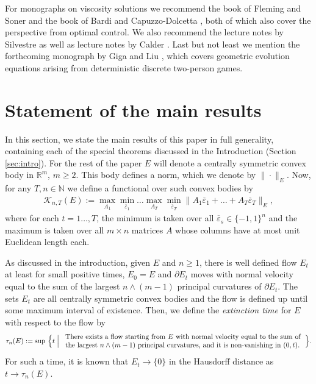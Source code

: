 \documentclass[reqno]{amsart}
\numberwithin{equation}{section}
\newcommand{\R}{\mathbb R}
\begin{document}
For monographs on viscosity solutions we recommend the book of Fleming and Soner \cite{fleming2006controlled} and the book of Bardi and Capuzzo-Dolcetta \cite{bardi1997optimal}, both of which also cover the perspective from optimal control. We also recommend the lecture notes by Silvestre \cite{silvestre15} as well as lecture notes by Calder \cite{calder24}.  Last but not least we mention the forthcoming monograph by Giga and Liu \cite{GL26}, which covers geometric evolution equations arising from deterministic discrete two-person games.






 


\section{Statement of the main results}\label{s:main results}

In this section, we state the main results of this paper in full generality, containing each of the special theorems discussed in the Introduction (Section \ref{sec:intro}).  For the rest of the paper $E$ will denote a centrally symmetric convex body in $\R^m$,  $m\geq 2$. This body defines a norm, which we denote by $\|\cdot\|_E$. Now, for any $T,n \in \mathbb{N}$ we define a functional over such convex bodies by
\begin{align*}
  \mathcal{K}_{n,T}(E) := \max_{A_1}\min_{\overline \varepsilon_1}\ldots \max_{A_T}\min_{\overline \varepsilon_T}\|A_1\overline \varepsilon_1+\ldots+A_T\overline \varepsilon_T\|_E,
\end{align*}
where for each $t=1\ldots,T$, the minimum is taken over all $\overline \varepsilon_s \in \{-1,1\}^n$ and the maximum is taken over all $m\times n$ matrices $A$ whose columns have at most unit Euclidean length each. 

As discussed in the introduction, given  $E$ and $n\geq 1$, there is well defined flow $E_t$  at least for small positive times,  $E_0 = E$ and $\partial E_t$ moves with normal velocity equal to the sum of the largest $n\wedge (m-1)$ principal curvatures of $\partial E_t$. The sets $E_t$ are all centrally symmetric convex bodies and the flow is defined up until some maximum interval of existence. Then, we define the \emph{extinction time} for $E$ with respect to the  flow by
\begin{align}\label{e:extinction time functional}
  \tau_n(E) := \sup\, \Big\{  t   \Bigm| 
\begin{tabular}{l}
    There exists a flow starting from $E$ with normal velocity equal to the sum  of  \\
     the largest  $n\wedge (m-1)$ principal curvatures,  and it is non-vanishing in $(0,t)$.
\end{tabular}   \Big \}.
\end{align}
For such a time, it is known that $E_t \to \{0\}$ in the Hausdorff distance as $t\to \tau_n(E)$.
\end{document}
